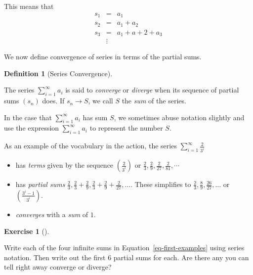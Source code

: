 \documentclass[
  letterpaper,
  DIV=11,
  numbers=noendperiod]{scrreprt}
\providecommand{\tightlist}{%
  \setlength{\itemsep}{0pt}\setlength{\parskip}{0pt}}
\theoremstyle{plain}
\theoremstyle{definition}
\newtheorem{exercise}{Exercise}[chapter]
\theoremstyle{plain}
\theoremstyle{plain}
\theoremstyle{definition}
\theoremstyle{definition}
\newtheorem{definition}{Definition}[chapter]
\theoremstyle{remark}
\begin{document}
This means that \[\begin{array}{ccl}
s_1&=&a_1\\
s_2&=&a_1+a_2\\
s_3&=&a_1+a+2+a_3\\
&\vdots&
\end{array}\]

We now define convergence of series in terms of the partial sums.

\begin{definition}[Series
Convergence]\protect\hypertarget{def-series-convergence}{}\label{def-series-convergence}

The series \(\displaystyle\sum_{i=1}^\infty a_i\) is said to
\emph{converge} or \emph{diverge} when its sequence of partial sums
\((s_n)\) does. If \(s_n\rightarrow S\), we call \(S\) the \emph{sum} of
the series.

\end{definition}

In the case that \(\displaystyle\sum_{i=1}^\infty a_i\) has sum \(S\),
we sometimes abuse notation slightly and use the expression
\(\displaystyle\sum_{i=1}^\infty a_i\) to represent the number \(S\).

As an example of the vocabulary in the action, the series
\(\displaystyle \sum_{i=1}^\infty \frac{2}{3^i}\)

\begin{itemize}
\tightlist
\item
  has \emph{terms} given by the sequence \(\left(\frac{2}{3^i}\right)\)
  or \(\frac{2}{3},\frac{2}{9},\frac{2}{27},\frac{2}{81},\cdots\)
\item
  has \emph{partial sums}
  \(\frac{2}{3},\frac{2}{3}+\frac{2}{9},\frac{2}{3}+\frac{2}{9}+\frac{2}{27},\ldots\).
  These simplifies to \(\frac{2}{3},\frac{8}{9},\frac{26}{27},\ldots\)
  or \(\left(\frac{3^i-1}{3^i}\right)\).
\item
  \emph{converges} with a \emph{sum} of \(1\).
\end{itemize}

\begin{exercise}[]\protect\hypertarget{exr-partial-sum-practice}{}\label{exr-partial-sum-practice}

Write each of the four infinite sums in Equation~\ref{eq-first-examples}
using series notation. Then write out the first 6 partial sums for each.
Are there any you can tell right away converge or diverge?

\end{exercise}
\end{document}
